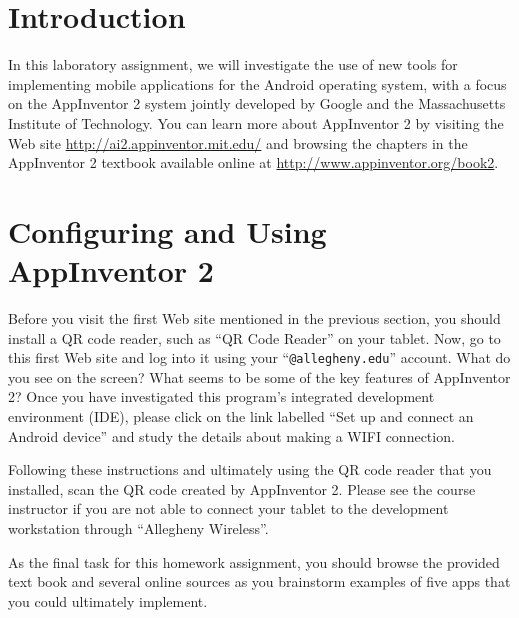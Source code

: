 


\usepackage[compact]{titlesec}



\vspace*{-.1in}
\section*{Introduction}

In this laboratory assignment, we will investigate the use of new tools for implementing mobile applications for the
Android operating system, with a focus on the AppInventor 2 system jointly developed by Google and the Massachusetts
Institute of Technology.  You can learn more about AppInventor 2 by visiting the Web site
\url{http://ai2.appinventor.mit.edu/} and browsing the chapters in the AppInventor 2 textbook available online at
\url{http://www.appinventor.org/book2}.

\section*{Configuring and Using AppInventor 2}

Before you visit the first Web site mentioned in the previous section, you should install a QR code reader, such as ``QR
Code Reader'' on your tablet. Now, go to this first Web site and log into it using your ``{\tt @allegheny.edu}''
account. What do you see on the screen? What seems to be some of the key features of AppInventor 2? Once you have
investigated this program's integrated development environment (IDE), please click on the link labelled ``Set up and
connect an Android device'' and study the details about making a WIFI connection. 

Following these instructions and ultimately using the QR code reader that you installed, scan the QR code created by
AppInventor 2. Please see the course instructor if you are not able to connect your tablet to the development
workstation through ``Allegheny Wireless''.





As the final task for this homework assignment, you should browse the provided text book and several online sources as
you brainstorm examples of five apps that you could ultimately implement.


